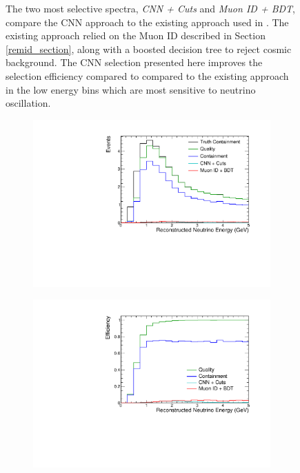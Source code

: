 \begin{figure}
{The two most selective spectra, \textit{CNN + Cuts} and
\textit{Muon ID + BDT}, compare
the CNN approach to the existing approach used in \cite{nova2016numu}.
The existing approach relied on the Muon ID described in
Section \ref{remid_section}, along with a boosted decision tree
\cite{friedman2002stochastic} to reject cosmic background.
The CNN selection presented here improves the selection efficiency compared to
compared to the existing approach in the low energy bins which are most
sensitive to neutrino oscillation.

}
\label{cut_flow_comp_sig}
\end{figure}

\begin{figure}
\vspace{-30pt}
\begin{center}
  \begin{subfigure}[b]{0.7\textwidth}

    \centering
    \includegraphics[width=\textwidth]{figures/selection/cosmic_bkg_osc.pdf}
  \end{subfigure}

  \begin{subfigure}[b]{0.7\textwidth}
    \centering
    \includegraphics[width=\textwidth]{figures/selection/cosmic_bkg_eff_osc.pdf}
  \end{subfigure}


\end{center}
\end{figure}
